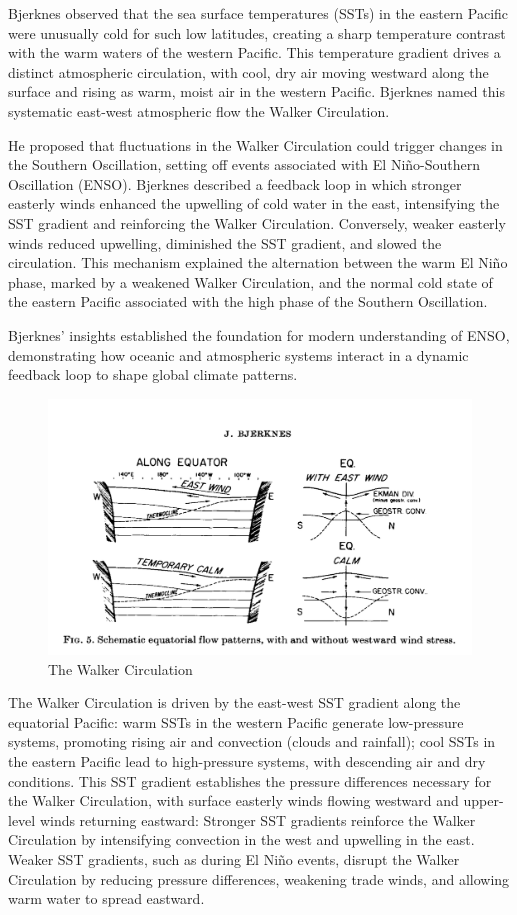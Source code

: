 Bjerknes observed that the sea surface temperatures (SSTs) in the eastern Pacific were unusually cold for such low latitudes, creating a sharp temperature contrast with the warm waters of the western Pacific. This temperature gradient drives a distinct atmospheric circulation, with cool, dry air moving westward along the surface and rising as warm, moist air in the western Pacific. Bjerknes named this systematic east-west atmospheric flow the Walker Circulation.

He proposed that fluctuations in the Walker Circulation could trigger changes in the Southern Oscillation, setting off events associated with El Niño-Southern Oscillation (ENSO). Bjerknes described a feedback loop in which stronger easterly winds enhanced the upwelling of cold water in the east, intensifying the SST gradient and reinforcing the Walker Circulation. Conversely, weaker easterly winds reduced upwelling, diminished the SST gradient, and slowed the circulation. This mechanism explained the alternation between the warm El Niño phase, marked by a weakened Walker Circulation, and the normal cold state of the eastern Pacific associated with the high phase of the Southern Oscillation.

Bjerknes’ insights established the foundation for modern understanding of ENSO, demonstrating how oceanic and atmospheric systems interact in a dynamic feedback loop to shape global climate patterns.
\begin{figure}[htp!]
	\centering
	\includegraphics[width=0.5\linewidth]{uploads/Screenshot 2024-11-24 191635.png}
	\caption{The Walker Circulation}
	\label{fig:enter-label}
\end{figure}
The Walker Circulation is driven by the east-west SST gradient along the equatorial Pacific: warm SSTs in the western Pacific generate low-pressure systems, promoting rising air and convection (clouds and rainfall); cool SSTs in the eastern Pacific lead to high-pressure systems, with descending air and dry conditions.
This SST gradient establishes the pressure differences necessary for the Walker Circulation, with surface easterly winds flowing westward and upper-level winds returning eastward: Stronger SST gradients reinforce the Walker Circulation by intensifying convection in the west and upwelling in the east. Weaker SST gradients, such as during El Niño events, disrupt the Walker Circulation by reducing pressure differences, weakening trade winds, and allowing warm water to spread eastward.

